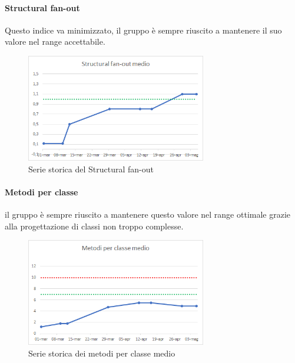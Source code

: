     \paragraph{Structural fan-out} \Spazio
    Questo indice va minimizzato, il gruppo è sempre riuscito a mantenere il suo valore nel range accettabile.
    \begin{figure}[H]
    	\centering 
    	\includegraphics[width=0.7\textwidth]{Images/SFOUT.png}
    	\caption{Serie storica del Structural fan-out}
    	\label{SFOUT} 
    \end{figure}
    \paragraph{Metodi per classe} \Spazio
    il gruppo è sempre riuscito a mantenere questo valore nel range ottimale grazie alla progettazione di classi non troppo complesse.
    \begin{figure}[H]
    	\centering 
    	\includegraphics[width=0.7\textwidth]{Images/metodi.png}
    	\caption{Serie storica dei metodi per classe medio}
    	\label{metodi} 
    \end{figure}
